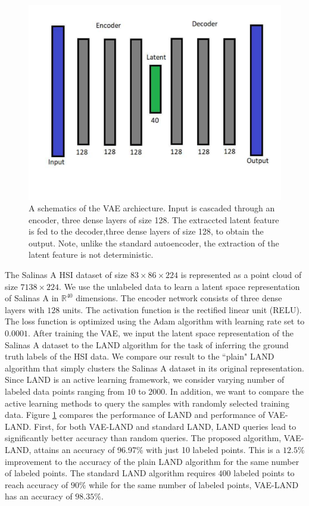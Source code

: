\documentclass{article}
\def\R{\mathbb{R}}
\def\R{{\mathbb R}}
\begin{document}
\begin{figure}[htb]
\includegraphics[clip,width=.45\textwidth,trim=1cm 3.5cm 1cm 1cm]{Images/VAE_Schematics.pdf}
\caption{\small{A schematics of the VAE archiecture. Input is cascaded through an encoder, three dense layers of size 128. The extraccted latent feature is fed to the decoder,three dense
layers of size 128, to obtain the output. Note, unlike the standard autoencoder, the extraction of the latent feature is not deterministic.   }}
\label{fig:SalinasA}
\end{figure}
The Salinas A HSI dataset of size $83 \times 86\times 224$ is represented as a point cloud of size $7138\times 224$. We use the unlabeled data to learn a latent space representation of Salinas A in $\R^{40}$ dimensions. The encoder network consists of three dense layers with $128$ units. The activation function is the rectified linear unit (RELU). The loss function is optimized using the Adam algorithm with learning rate set to $0.0001$. After training the VAE, we input the latent space representation of the Salinas A dataset to the LAND algorithm for the task of inferring the ground truth labels of the HSI data. We compare our result to the ``plain" LAND algorithm that simply clusters the Salinas A dataset in its original representation. Since LAND is an active learning framework, we consider varying number of labeled data points ranging from $10$ to $2000$. In addition, we want to compare the active learning methods to query the samples with randomly selected training data. Figure \ref{fig:SalinasA} compares the performance of LAND and performance of VAE-LAND. First, for both VAE-LAND and standard LAND, LAND queries lead to significantly better accuracy than random queries. The proposed algorithm, VAE-LAND, attains an accuracy of 96.97\% with just 10 labeled points. This is a $12.5\%$ improvement to the accuracy of the plain LAND algorithm for the same number of labeled points. The standard LAND algorithm requires $400$ labeled points to reach accuracy of $90\%$ while for the same number of labeled points, VAE-LAND has an accuracy of $98.35\%$. 
\end{document}
